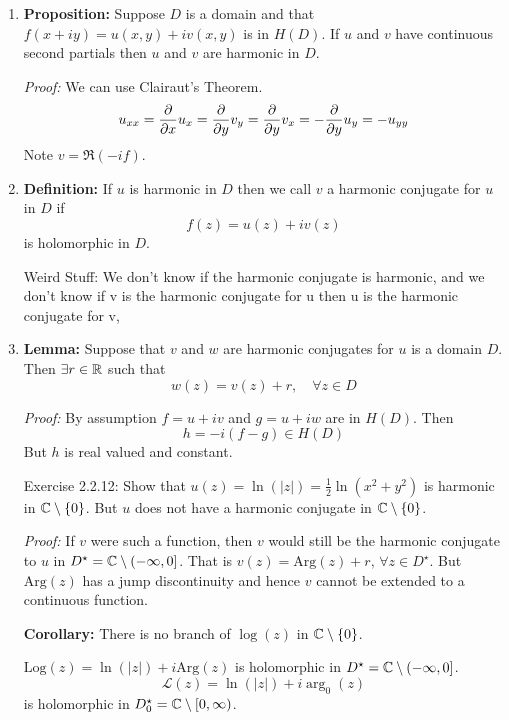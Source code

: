 \documentclass[12pt]{article}
\begin{document}
\begin{enumerate}
    \item \textbf{Proposition:} Suppose $D$ is a domain and that $f(x+iy) = u(x,y) + iv(x,y)$ is in $H(D)$. If $u$ and $v$ have continuous second partials then $u$ and $v$ are harmonic in $D$. 
    
    \textit{Proof:} We can use Clairaut's Theorem. 
    \[u_{xx} = \frac{\partial}{\partial x} u_x = \frac{\partial}{\partial y} v_y = \frac{\partial}{\partial y} v_x = -\frac{\partial}{\partial y} u_y = -u_{yy}\]
    Note $v = \Re (-if)$. 

    \item \textbf{Definition:} If $u$ is harmonic in $D$ then we call $v$ a harmonic conjugate for $u$ in $D$ if 
    \[f(z) = u(z) + iv(z)\]
    is holomorphic in $D$.

    Weird Stuff: We don't know if the harmonic conjugate is harmonic, and we don't know if v is the harmonic conjugate for u then u is the harmonic conjugate for v, 

    \item \textbf{Lemma:} Suppose that $v$ and $w$ are harmonic conjugates for $u$ is a domain $D$. Then $\exists r \in \mathbb R$ such that 
    \[w(z) = v(z) + r, \quad \forall z \in D\]

    \textit{Proof:} By assumption $f = u + iv$ and $g = u + iw$ are in $H(D)$. Then 
    \[h = -i(f-g)  \in H(D)\]
    But $h$ is real valued and constant. 

    Exercise 2.2.12: Show that $u(z) = \ln(|z|) = \frac{1}{2} \ln(x^2+y^2)$ is harmonic in $\mathbb C \setminus \{0\}$. But $u$ does not have a harmonic conjugate in $\mathbb C \setminus \{0\}$. 

    \textit{Proof:} If $v$ were such a function, then $v$ would still be the harmonic conjugate to $u$ in $D^\star = \mathbb C \setminus (-\infty, 0]$. That is $v(z) = \text{Arg}(z) + r, \, \forall z \in D^\star$. 
    But $\text{Arg}(z)$ has a jump discontinuity and hence $v$ cannot be extended to a continuous function. 


    \textbf{Corollary:} There is no branch of $\log(z)$ in $\mathbb C\setminus \{0\}$. 


    $\text{Log}(z) = \ln(|z|) + i \text{Arg}(z)$ is holomorphic in $D^\star = \mathbb C \setminus (-\infty, 0]$. 
    \[\mathcal{L}(z) =\ln(|z|) + i \arg_0(z) \] 
    is holomorphic in $D^\star_0 = \mathbb C \setminus [0, \infty)$. 
\end{enumerate}

\newpage
\end{document}
